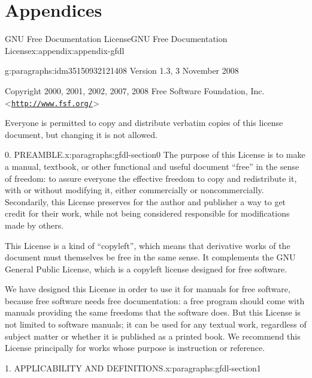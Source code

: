 \documentclass[twoside,10pt,]{book}
\numberwithin{equation}{part}
\begin{document}
\part*{Appendices}%
%
%
\typeout{************************************************}
\typeout{************************************************}
%
\begin{appendixptx}{GNU Free Documentation License}{}{GNU Free Documentation License}{}{}{x:appendix:appendix-gfdl}
\begin{paragraphs}{}{g:paragraphs:idm35150932121408}%
Version 1.3, 3 November 2008%
\par
Copyright \textcopyright{} 2000, 2001, 2002, 2007, 2008 Free Software Foundation, Inc. \textless{}\href{http://www.fsf.org/}{\nolinkurl{http://www.fsf.org/}}\textgreater{}%
\par
Everyone is permitted to copy and distribute verbatim copies of this license document, but changing it is not allowed.%
\end{paragraphs}%
\begin{paragraphs}{0. PREAMBLE.}{x:paragraphs:gfdl-section0}%
The purpose of this License is to make a manual, textbook, or other functional and useful document ``free'' in the sense of freedom: to assure everyone the effective freedom to copy and redistribute it, with or without modifying it, either commercially or noncommercially. Secondarily, this License preserves for the author and publisher a way to get credit for their work, while not being considered responsible for modifications made by others.%
\par
This License is a kind of ``copyleft'', which means that derivative works of the document must themselves be free in the same sense. It complements the GNU General Public License, which is a copyleft license designed for free software.%
\par
We have designed this License in order to use it for manuals for free software, because free software needs free documentation: a free program should come with manuals providing the same freedoms that the software does. But this License is not limited to software manuals; it can be used for any textual work, regardless of subject matter or whether it is published as a printed book. We recommend this License principally for works whose purpose is instruction or reference.%
\end{paragraphs}%
\begin{paragraphs}{1. APPLICABILITY AND DEFINITIONS.}{x:paragraphs:gfdl-section1}%

\end{paragraphs}
\end{appendixptx}
\end{document}
